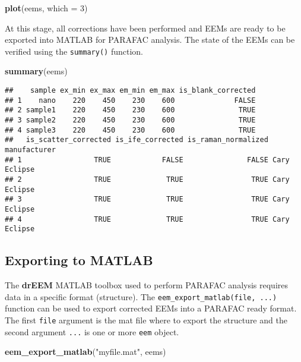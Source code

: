 \documentclass[]{book}
\newenvironment{Shaded}{\begin{snugshade}}{\end{snugshade}}
\newcommand{\KeywordTok}[1]{\textcolor[rgb]{0.13,0.29,0.53}{\textbf{{#1}}}}
\newcommand{\DataTypeTok}[1]{\textcolor[rgb]{0.13,0.29,0.53}{{#1}}}
\newcommand{\DecValTok}[1]{\textcolor[rgb]{0.00,0.00,0.81}{{#1}}}
\newcommand{\StringTok}[1]{\textcolor[rgb]{0.31,0.60,0.02}{{#1}}}
\newcommand{\NormalTok}[1]{{#1}}
\begin{document}
\begin{Shaded}
\begin{Highlighting}[]
\KeywordTok{plot}\NormalTok{(eems, }\DataTypeTok{which =} \DecValTok{3}\NormalTok{)}
\end{Highlighting}
\end{Shaded}

At this stage, all corrections have been performed and EEMs are ready to
be exported into MATLAB for PARAFAC analysis. The state of the EEMs can
be verified using the \texttt{summary()} function.

\begin{Shaded}
\begin{Highlighting}[]
\KeywordTok{summary}\NormalTok{(eems)}
\end{Highlighting}
\end{Shaded}

\begin{verbatim}
##    sample ex_min ex_max em_min em_max is_blank_corrected
## 1    nano    220    450    230    600              FALSE
## 2 sample1    220    450    230    600               TRUE
## 3 sample2    220    450    230    600               TRUE
## 4 sample3    220    450    230    600               TRUE
##   is_scatter_corrected is_ife_corrected is_raman_normalized manufacturer
## 1                 TRUE            FALSE               FALSE Cary Eclipse
## 2                 TRUE             TRUE                TRUE Cary Eclipse
## 3                 TRUE             TRUE                TRUE Cary Eclipse
## 4                 TRUE             TRUE                TRUE Cary Eclipse
\end{verbatim}

\subsection{Exporting to MATLAB}\label{exporting-to-matlab}

The \textbf{drEEM} MATLAB toolbox \citep{Murphy2013} used to perform
PARAFAC analysis requires data in a specific format (structure). The
\texttt{eem\_export\_matlab(file,\ ...)} function can be used to export
corrected EEMs into a PARAFAC ready format. The first \texttt{file}
argument is the mat file where to export the structure and the second
argument \texttt{...} is one or more \texttt{eem} object.

\begin{Shaded}
\begin{Highlighting}[]
\KeywordTok{eem_export_matlab}\NormalTok{(}\StringTok{"myfile.mat"}\NormalTok{, eems)}
\end{Highlighting}
\end{Shaded}
\end{document}
